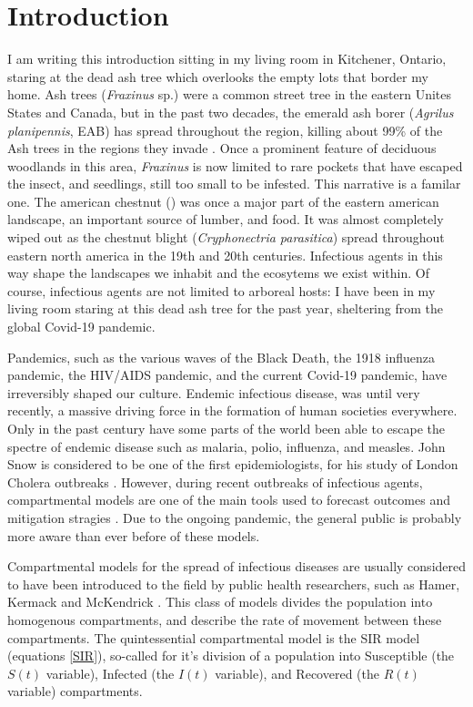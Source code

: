 \chapter{Introduction}

I am writing this introduction sitting in my living room in Kitchener, Ontario, staring at the dead ash tree which overlooks the empty lots that border my home. Ash trees (\textit{Fraxinus} sp.) were a common street tree in the eastern Unites States and Canada, but in the past two decades, the emerald ash borer (\textit{Agrilus planipennis}, EAB) has spread throughout the region, killing about 99\% of the Ash trees in the regions they invade \cite{nrcaneab,herms2014emerald}. Once a prominent feature of deciduous woodlands in this area, \textit{Fraxinus} is now limited to rare pockets that have escaped the insect, and seedlings, still too small to be infested. This narrative is a familar one. The american chestnut () was once a major part of the eastern american landscape, an important source of lumber, and food. It was almost completely wiped out as the chestnut blight (\textit{Cryphonectria parasitica}) spread throughout eastern north america in the 19th and 20th centuries. Infectious agents in this way shape the landscapes we inhabit and the ecosytems we exist within. Of course, infectious agents are not limited to arboreal hosts: I have been in my living room staring at this dead ash tree for the past year, sheltering from the global Covid-19 pandemic. 

Pandemics, such as the various waves of the Black Death, the 1918 influenza pandemic, the HIV/AIDS pandemic, and the current Covid-19 pandemic, have irreversibly shaped our culture. Endemic infectious disease, was until very recently, a massive driving force in the formation of human societies everywhere. Only in the past century have some parts of the world been able to escape the spectre of endemic disease such as malaria, polio, influenza, and measles. John Snow is considered to be one of the first epidemiologists, for his study of London Cholera outbreaks \cite{snow1855mode, brauer2019mathematical}. However, during recent outbreaks of infectious agents, compartmental models are one of the main tools used to forecast outcomes and mitigation stragies \cite{brauer2008compartmental}. Due to the ongoing pandemic, the general public is probably more aware than ever before of these models.

Compartmental models for the spread of infectious diseases are usually considered to have been introduced to the field by public health researchers, such as Hamer, Kermack and McKendrick \cite{hamer1906epidemic, kermack1927contribution, brauer2019mathematical,edelstein2005mathematical}. This class of models divides the population into homogenous compartments, and describe the rate of movement between these compartments. The quintessential compartmental model is the SIR model (equations \ref{SIR}), so-called for it's division of a population into Susceptible (the $S(t)$ variable), Infected (the $I(t)$ variable), and Recovered (the $R(t)$ variable) compartments.

